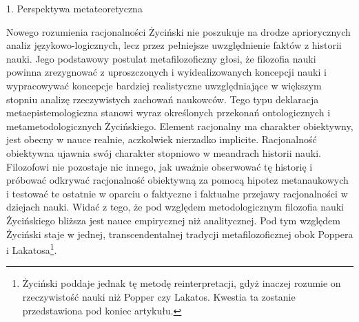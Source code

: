 \documentclass{article}
\begin{document}
1. Perspektywa metateoretyczna

Nowego rozumienia racjonalności Życiński nie poszukuje na drodze apriorycznych analiz językowo-logicznych, lecz przez
pełniejsze uwzględnienie faktów z historii nauki. Jego podstawowy postulat metafilozoficzny głosi, że filozofia nauki
powinna zrezygnować z uproszczonych i wyidealizowanych koncepcji nauki i wypracowywać koncepcje bardziej realistyczne
uwzględniające w większym stopniu analizę rzeczywistych zachowań naukowców. Tego typu deklaracja metaepistemologiczna
stanowi wyraz określonych przekonań ontologicznych i metametodologicznych Życińskiego. Element racjonalny ma charakter
obiektywny, jest obecny w nauce realnie, aczkolwiek nierzadko implicite. Racjonalność obiektywna ujawnia swój charakter
stopniowo w meandrach historii nauki. Filozofowi nie pozostaje nic innego, jak uważnie obserwować tę historię i
próbować odkrywać racjonalność obiektywną za pomocą hipotez metanaukowych i testować te ostatnie w oparciu o faktyczne
i faktualne przejawy racjonalności w dziejach nauki. Widać z tego, że pod względem metodologicznym filozofia nauki
Życińskiego bliższa jest nauce empirycznej niż analitycznej. Pod tym względem Życiński staje w jednej,
transcendentalnej tradycji metafilozoficznej obok Poppera i Lakatosa\footnote{Życiński poddaje jednak tę metodę
reinterpretacji, gdyż inaczej rozumie on rzeczywistość nauki niż Popper czy Lakatos. Kwestia ta zostanie przedstawiona
pod koniec artykułu.}.
\end{document}
